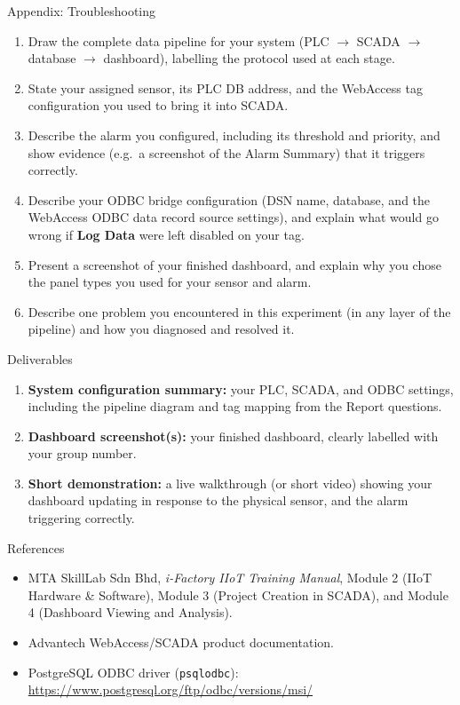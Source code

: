\begin{labsection}{Appendix: Troubleshooting}{}
\begin{procedure}
  \end{procedure}

  \begin{reportq}
    \begin{enumerate}
      \item Draw the complete data pipeline for your system (PLC $\to$ SCADA $\to$ database $\to$ dashboard), labelling the protocol used at each stage.
      \item State your assigned sensor, its PLC DB address, and the WebAccess tag configuration you used to bring it into SCADA.
      \item Describe the alarm you configured, including its threshold and priority, and show evidence (e.g.\ a screenshot of the Alarm Summary) that it triggers correctly.
      \item Describe your ODBC bridge configuration (DSN name, database, and the WebAccess ODBC data record source settings), and explain what would go wrong if \textbf{Log Data} were left disabled on your tag.
      \item Present a screenshot of your finished dashboard, and explain why you chose the panel types you used for your sensor and alarm.
      \item Describe one problem you encountered in this experiment (in any layer of the pipeline) and how you diagnosed and resolved it.
    \end{enumerate}
  \end{reportq}
  \newpage

  \begin{labsection}{Deliverables}{}
    \begin{enumerate}
      \item \textbf{System configuration summary:} your PLC, SCADA, and ODBC settings, including the pipeline diagram and tag mapping from the Report questions.
      \item \textbf{Dashboard screenshot(s):} your finished dashboard, clearly labelled with your group number.
      \item \textbf{Short demonstration:} a live walkthrough (or short video) showing your dashboard updating in response to the physical sensor, and the alarm triggering correctly.
    \end{enumerate}
  \end{labsection}

  \begin{labsection}{References}{}
    \begin{itemize}
      \item MTA SkillLab Sdn Bhd, \textit{i-Factory IIoT Training Manual}, Module 2 (IIoT Hardware \& Software), Module 3 (Project Creation in SCADA), and Module 4 (Dashboard Viewing and Analysis).
      \item Advantech WebAccess/SCADA product documentation.
      \item PostgreSQL ODBC driver (\texttt{psqlodbc}): \url{https://www.postgresql.org/ftp/odbc/versions/msi/}
    \end{itemize}
  \end{labsection}


\end{labsection}
